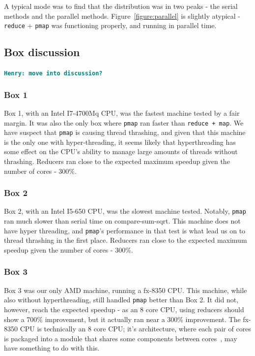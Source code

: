 \documentclass[12pt]{article}
\newcommand{\comment}[1]{{\bf \tt  {#1}}}
\newcommand{\hfcomment}[1]{\textcolor{Teal}{\comment{Henry: {#1}}}}
\newcommand{\clocode}[1]{{\texttt {#1}}}
\begin{document}
A typical mode was to find that the distribution was in two peaks - the serial methods and the parallel methods. Figure~\ref{figure:parallel} is slightly atypical - \clocode{reduce} + \clocode{pmap} was functioning properly, and running in parallel time.

\subsection{Box discussion}\label{sec:boxdiscussion}

\hfcomment{move into discussion?}
\subsubsection{Box 1}

Box 1, with an Intel I7-4700Mq CPU, was the fastest machine tested by a fair margin. It was also the only box where \clocode{pmap} ran faster than \clocode{reduce + map}. We have suspect that \clocode{pmap} is causing thread thrashing, and given that this machine is the only one with hyper-threading, it seems likely that hyperthreading has some effect on the CPU's ability to manage large amounts of threads without thrashing. Reducers ran close to the expected maximum speedup given the number of cores - 300\%.

\subsubsection{Box 2}

Box 2, with an Intel I5-650 CPU, was the slowest machine tested. Notably, \clocode{pmap} ran much slower than serial time on compare-sum-sqrt. This machine does not have hyper threading, and \clocode{pmap}'s performance in that test is what lead us on to thread thrashing in the first place. Reducers ran close to the expected maximum speedup given the number of cores - 300\%.

\subsubsection{Box 3}

Box 3 was our only AMD machine, running a fx-8350 CPU. This machine, while also without hyperthreading, still handled \clocode{pmap} better than Box 2. It did not, however, reach the expected speedup - as an 8 core CPU, using reducers should show a 700\% improvement, but it actually ran near a 300\% improvement. The fx-8350 CPU is technically an 8 core CPU; it's architecture, where each pair of cores is packaged into a module that shares some components between cores~\cite{McIntyre:2012}, may have something to do with this.
\end{document}
